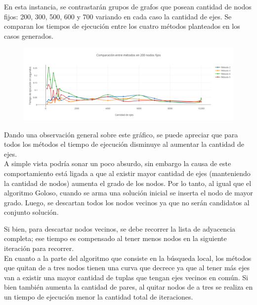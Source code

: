 En esta instancia, se contrastar\'an grupos de grafos que posean cantidad de nodos fijos: 200, 300, 500, 600 y 700 variando en cada caso la cantidad de ejes. Se comparan los tiempos de ejecuci\'on entre los cuatro m\'etodos planteados en los casos generados. 

  \begin{figure}[h!]
   \begin{center}
 	\includegraphics[scale=0.55]{imagenes/local/tiempos/200nodos.png}
   \end{center}
 \end{figure}
 
Dando una observaci\'on general sobre este gr\'afico, se puede apreciar que para todos los m\'etodos el tiempo de ejecuci\'on disminuye al aumentar la cantidad de ejes. \\

A simple vista podr\'ia sonar un poco absurdo, sin embargo la causa de este comportamiento  est\'a ligada a que al existir mayor cantidad de ejes (manteniendo la cantidad de nodos) aumenta el grado de los nodos. Por lo tanto, al igual que el algoritmo Goloso, cuando se arma una soluci\'on inicial se inserta el nodo de mayor grado. Luego, se descartan todos los nodos vecinos ya que no ser\'an candidatos al conjunto soluci\'on.

Si bien, para descartar nodos vecinos, se debe recorrer la lista de adyacencia completa; ese tiempo es compensado al tener menos nodos en la siguiente iteraci\'on para recorrer.\\

En cuanto a la parte del algoritmo que consiste en la b\'usqueda local, los métodos que quitan de a tres nodos tienen una curva que decrece ya que al tener más ejes van a existir una mayor cantidad de tuplas que tengan ejes vecinos en común. Si bien también aumenta la cantidad de pares, al quitar nodos de a tres se realiza en un tiempo de ejecución menor la cantidad total de iteraciones. 

